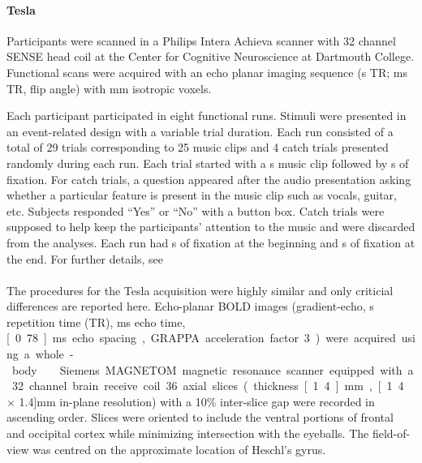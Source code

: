 \paragraph{\unit[3]{Tesla}}
%
Participants were scanned in a Philips Intera Achieva scanner with 32 channel
SENSE head coil at the Center for Cognitive Neuroscience at Dartmouth College.
Functional scans were acquired with an echo planar imaging sequence
(\unit[2]{s} TR; \unit[35]{ms} TR, \unit[90]{\textdegree} flip angle) with
\unit[3]{mm} isotropic voxels.

Each participant participated in eight functional runs. Stimuli were presented in
an event-related design with a variable trial duration. Each run consisted of a
total of 29 trials corresponding to 25 music clips and 4 catch trials presented
randomly during each run. Each trial started with a \unit[6]{s} music clip
followed by \unit[4-8]{s} of fixation. For catch trials, a question appeared
after the audio presentation asking whether a particular feature is present in
the music clip such as vocals, guitar, etc. Subjects responded “Yes” or “No”
with a button box. Catch trials were supposed to help keep the participants’ attention to the
music and were discarded from the analyses. Each run had \unit[4]{s} of
fixation at the beginning and \unit[10]{s} of fixation at the end. For further
details, see \citet{CTK+2012}

\paragraph{\sevenT}
%
The procedures for the \unit[7]{Tesla} acquisition were highly similar and only
criticial differences are reported here. Echo-planar BOLD images
(gradient-echo, \unit[2]{s} repetition time (TR), \unit[22]{ms} echo time,
\unit[0.78]{ms} echo spacing, GRAPPA acceleration factor 3) were acquired using
a whole-body \sevenT\ Siemens MAGNETOM magnetic resonance scanner equipped with
a 32 channel brain receive coil. 36 axial slices (thickness \unit[1.4]{mm},
\unit[1.4 $\times$ 1.4]{mm} in-plane resolution) with a 10\% inter-slice gap
were recorded in ascending order.  Slices were oriented to include the ventral
portions of frontal and occipital cortex while minimizing intersection with the
eyeballs. The field-of-view was centred on the approximate location of Heschl's
gyrus.

